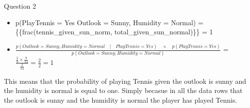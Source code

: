 \documentclass[11pt]{article}
\begin{document}
    Question 2

\begin{itemize}
\item
  p(PlayTennis = Yes \textbar{} Outlook = Sunny, Humidity = Normal) =
  \{\{frac(tennis\_given\_sun\_norm, total\_given\_sun\_normal)\}\} = 1
\item
  \(\frac{p(Outlook = Sunny, Humidity = Normal \quad |\quad PlayTennis = Yes) \quad \times \quad p(PlayTennis = Yes)}{p(Outlook = Sunny, Humidity = Normal)}\)
  =
  \(\frac{\frac{2}{9} \times \frac{9}{14}}{\frac{2}{14}} = \frac{2}{2} = 1\)
\end{itemize}

This means that the probability of playing Tennis given the outlook is
sunny and the humidity is normal is equal to one. Simply becasue in all
the data rows that the outlook is sunny and the humidity is normal the
player has played Tennis.
\end{document}
